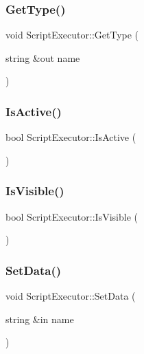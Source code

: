\hypertarget{class_script_executor_a59b35ffd0d2ee12acdce9fe32b8ebdb0}{}\label{class_script_executor_a59b35ffd0d2ee12acdce9fe32b8ebdb0} 
\subsubsection{\texorpdfstring{Get\+Type()}{GetType()}}
{\footnotesize\ttfamily void Script\+Executor\+::\+Get\+Type (\begin{DoxyParamCaption}\item[{string \&out}]{name }\end{DoxyParamCaption})}

\hypertarget{class_script_executor_a046f3bfe3d4869072c381d302b2d2b2c}{}\label{class_script_executor_a046f3bfe3d4869072c381d302b2d2b2c} 
\subsubsection{\texorpdfstring{Is\+Active()}{IsActive()}}
{\footnotesize\ttfamily bool Script\+Executor\+::\+Is\+Active (\begin{DoxyParamCaption}{ }\end{DoxyParamCaption})}

\hypertarget{class_script_executor_a456e506ec644ca7d672ca7b719d544c6}{}\label{class_script_executor_a456e506ec644ca7d672ca7b719d544c6} 
\subsubsection{\texorpdfstring{Is\+Visible()}{IsVisible()}}
{\footnotesize\ttfamily bool Script\+Executor\+::\+Is\+Visible (\begin{DoxyParamCaption}{ }\end{DoxyParamCaption})}

\hypertarget{class_script_executor_a49a0a9223c11a536b4c573e78a46a43f}{}\label{class_script_executor_a49a0a9223c11a536b4c573e78a46a43f} 
\subsubsection{\texorpdfstring{Set\+Data()}{SetData()}}
{\footnotesize\ttfamily void Script\+Executor\+::\+Set\+Data (\begin{DoxyParamCaption}\item[{string \&in}]{name }\end{DoxyParamCaption})}

